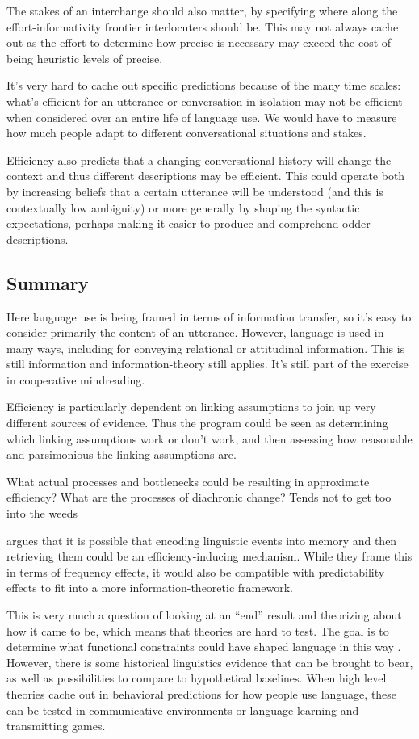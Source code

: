 \documentclass[]{article}
\begin{document}
The stakes of an interchange should also matter, by specifying where along the effort-informativity frontier interlocuters should be. This may not always cache out as the effort to determine how precise is necessary may exceed the cost of being heuristic levels of precise. 

It's very hard to cache out specific predictions because of the many time scales: what's efficient for an utterance or conversation in isolation may not be efficient when considered over an entire life of language use. We would have to measure how much people adapt to different conversational situations and stakes. 

Efficiency also predicts that a changing conversational history will change the context and thus different descriptions may be efficient. This could operate both by increasing beliefs that a certain utterance will be understood (and this is contextually low ambiguity) or more generally by shaping the syntactic expectations, perhaps making it easier to produce and comprehend odder descriptions. 


\subsection{Summary}
Here language use is being framed in terms of information transfer, so it's easy to consider primarily the content of an utterance. However, language is used in many ways, including for conveying relational or attitudinal information. This is still information and information-theory still applies. It's still part of the exercise in cooperative mindreading. 

Efficiency is particularly dependent on linking assumptions to join up very different sources of evidence. Thus the program could be seen as determining which linking assumptions work or don't work, and then assessing how reasonable and parsimonious the linking assumptions are. 

What actual processes and bottlenecks could be resulting in approximate efficiency? What are the processes of diachronic change? Tends not to get too into the weeds

\cite{bybee2006} argues that it is possible that encoding linguistic events into memory and then retrieving them could be an efficiency-inducing mechanism. While they frame this in terms of frequency effects, it would also be compatible with predictability effects to fit into a more information-theoretic framework. 

This is very much a question of looking at an ``end'' result and theorizing about how it came to be, which means that theories are hard to test. The goal is to determine what functional constraints could have shaped language in this way \cite{futrell2022}. However, there is some historical linguistics evidence that can be brought to bear, as well as possibilities to compare to hypothetical baselines. When high level theories cache out in behavioral predictions for how people use language, these can be tested in communicative environments or language-learning and transmitting games. 
\end{document}
